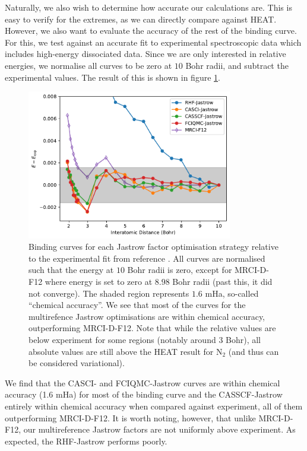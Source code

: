 Naturally, we also wish to determine how accurate our calculations are. This is easy to verify for the extremes, as we can directly compare against \gls{HEAT}.\supercite{fellerSurvey2008} However, we also want to evaluate the accuracy of the rest of the binding curve. For this, we test against an accurate fit to experimental spectroscopic data which includes high-energy dissociated data.\supercite{leroyAccurate2006} Since we are only interested in relative energies, we normalise all curves to be zero at $10$ Bohr radii, and subtract the experimental values. The result of this is shown in figure \ref{fig:binding-curves-experiment}.

\begin{figure}[htbp]
    \centering
    \includegraphics[width=0.8\textwidth]{figures/binding/residuals}
    \caption{Binding curves for each Jastrow factor optimisation strategy relative to the experimental fit from reference . All curves are normalised such that the energy at $10$ Bohr radii is zero, except for MRCI-D-F12 where energy is set to zero at $8.98$ Bohr radii (past this, it did not converge). The shaded region represents $1.6$ mHa, so-called ``chemical accuracy''. We see that most of the curves for the multirefence Jastrow optimisations are within chemical accuracy, outperforming MRCI-D-F12. Note that while the relative values are below experiment for some regions (notably around $3$ Bohr), all absolute values are still above the HEAT result for N$_2$ (and thus can be considered variational).}
    \label{fig:binding-curves-experiment}
\end{figure}

We find that the CASCI- and FCIQMC-Jastrow curves are within chemical accuracy (1.6 mHa) for most of the binding curve and the CASSCF-Jastrow entirely within chemical accuracy when compared against experiment, all of them outperforming MRCI-D-F12. It is worth noting, however, that unlike MRCI-D-F12, our multireference Jastrow factors are not uniformly above experiment. As expected, the RHF-Jastrow performs poorly.

